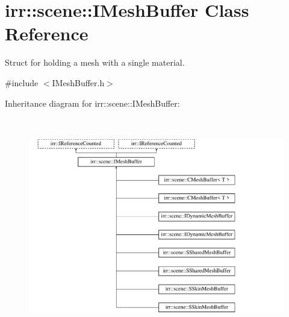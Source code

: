 \hypertarget{classirr_1_1scene_1_1IMeshBuffer}{}\section{irr\+:\+:scene\+:\+:I\+Mesh\+Buffer Class Reference}
\label{classirr_1_1scene_1_1IMeshBuffer}


Struct for holding a mesh with a single material.  




{\ttfamily \#include $<$I\+Mesh\+Buffer.\+h$>$}

Inheritance diagram for irr\+:\+:scene\+:\+:I\+Mesh\+Buffer\+:\begin{figure}[H]
\begin{center}
\leavevmode
\includegraphics[height=9.475466cm]{classirr_1_1scene_1_1IMeshBuffer}
\end{center}
\end{figure}
